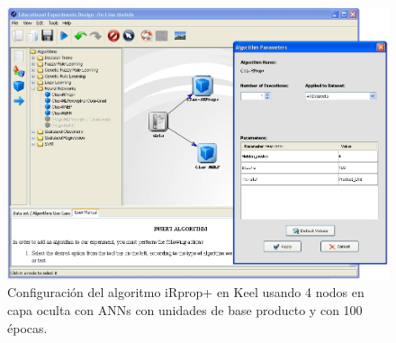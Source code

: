 \begin{figure}[!h]
\centering
\includegraphics[keepaspectratio,width=12.7cm]{figuras/keel3.jpg}
\caption{Configuración del algoritmo iRprop+ en Keel usando 4 nodos en capa oculta con ANNs con
unidades de base producto y con 100 épocas.}
\label{fig7aplica}
\end{figure}

